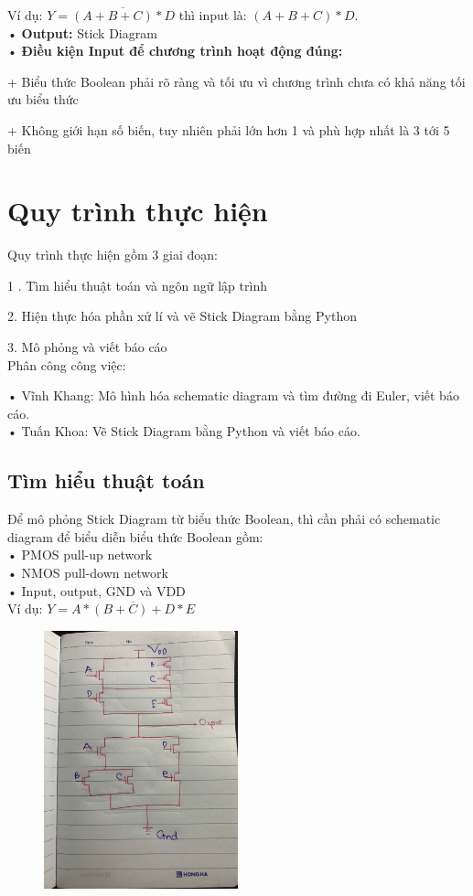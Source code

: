 \documentclass[a4paper,12pt]{article}
\begin{document}
Ví dụ: \( Y = \overline{(A + B + C) * D} \) thì input là: \( (A + B + C) * D \).\\
• \textbf{Output:} Stick Diagram\\
• \textbf{Điều kiện Input để chương trình hoạt động đúng:}

    + Biểu thức Boolean phải rõ ràng và tối ưu vì chương trình chưa có khả năng tối ưu biểu thức

    + Không giới hạn số biến, tuy nhiên phải lớn hơn 1 và phù hợp nhất là 3 tới 5 biến
\newpage
\section{Quy trình thực hiện}
Quy trình thực hiện gồm 3 giai đoạn:

1 . Tìm hiểu thuật toán và ngôn ngữ lập trình

2. Hiện thực hóa phần xử lí và vẽ Stick Diagram bằng Python

3. Mô phỏng và viết báo cáo\\
Phân công công việc:

• Vĩnh Khang: Mô hình hóa schematic diagram và tìm đường đi Euler, viết báo cáo.\\
• Tuấn Khoa: Vẽ Stick Diagram bằng Python và viết báo cáo.
\subsection{Tìm hiểu thuật toán}
Để mô phỏng Stick Diagram từ biểu thức Boolean, thì cần phải có schematic diagram để biểu diễn biểu thức Boolean gồm: \\
• PMOS pull-up network\\
• NMOS pull-down network\\
• Input, output, GND và VDD\\
Ví dụ: \( Y = \overline{A *(B + C) + D * E} \)\\
\begin{figure}[H]
    \centering
    \includegraphics[width=0.5\textwidth]{../PNG/ViDuSchematic.jpg}
    \label{fig:Ex_Schematic}\\
\end{figure}
\end{document}
